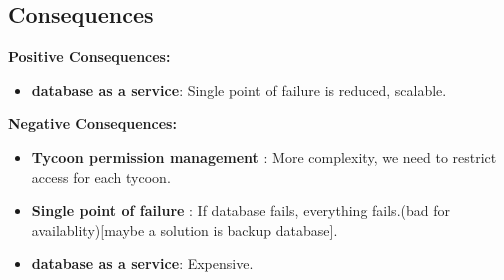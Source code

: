 \subsection*{Consequences}
\textbf{Positive Consequences:}
\begin{itemize}
    \item \textbf{database as a service}: Single point of failure is reduced, scalable.
\end{itemize}
\textbf{Negative Consequences:}
\begin{itemize}
    \item \textbf{Tycoon permission management} : More complexity, we need to restrict access for each tycoon.
    \item \textbf{Single point of failure} : If database fails, everything fails.(bad for availablity)[maybe a solution is backup database].
    \item \textbf{database as a service}: Expensive.
\end{itemize}